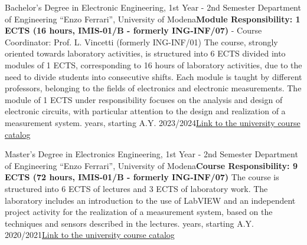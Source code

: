 {
{Bachelor's Degree in Electronic Engineering, 1st Year - 2nd Semester}
{\newline  Department of Engineering “Enzo Ferrari'', University of Modena}{\newline \textbf{Module Responsibility: 1 ECTS (16 hours, IMIS-01/B - formerly ING-INF/07)} - Course Coordinator: Prof. L. Vincetti (formerly ING-INF/01)\newline
    The course, strongly oriented towards laboratory activities, is structured into 6 ECTS divided into modules of 1 ECTS, corresponding to 16 hours of laboratory activities, due to the need to divide students into consecutive shifts. Each module is taught by different professors, belonging to the fields of electronics and electronic measurements. The module of 1 ECTS under responsibility focuses on the analysis and design of electronic circuits, with particular attention to the design and realization of a measurement system. years, starting A.Y. 2023/2024}{\href{https://unimore.coursecatalogue.cineca.it/insegnamenti/2024/27909/2021/10000/10359?coorte=2024}{Link to the university course catalog}}

{Master's Degree in Electronics Engineering, 1st Year - 2nd Semester}
{\newline  Department of Engineering “Enzo Ferrari'', University of Modena}{\newline \textbf{Course Responsibility: 9 ECTS (72 hours, IMIS-01/B - formerly ING-INF/07)}\newline
    The course is structured into 6 ECTS of lectures and 3 ECTS of laboratory work. The laboratory includes an introduction to the use of LabVIEW and an independent project activity for the realization of a measurement system, based on the techniques and sensors described in the lectures. years, starting A.Y. 2020/2021}{\href{https://unimore.coursecatalogue.cineca.it/insegnamenti/2024/27831/2024/10001/10858?coorte=2024}{Link to the university course catalog}}

}
